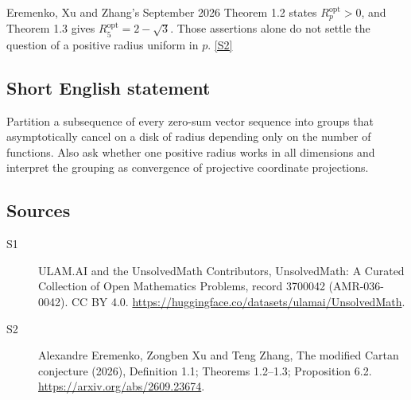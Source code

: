 \documentclass[11pt]{article}
\newcommand{\sref}[2]{\hyperlink{source:#1:#2}{[S#2]}}
\begin{document}
Eremenko, Xu and Zhang's September 2026 Theorem 1.2 states $R_p^{\mathrm{opt}}>0$, and Theorem 1.3 gives $R_5^{\mathrm{opt}}=2-\sqrt3$. Those assertions alone do not settle the question of a positive radius uniform in $p$. \sref{3700042}{2}
\subsection{Short English statement}
Partition a subsequence of every zero-sum vector sequence into groups that asymptotically cancel on a disk of radius depending only on the number of functions. Also ask whether one positive radius works in all dimensions and interpret the grouping as convergence of projective coordinate projections.
\subsection{Sources}
\begin{description}
\item[\hypertarget{source:3700042:1}{S1}] ULAM.AI and the UnsolvedMath Contributors, UnsolvedMath: A Curated Collection of Open Mathematics Problems, record 3700042 (AMR-036-0042). CC BY 4.0. \url{https://huggingface.co/datasets/ulamai/UnsolvedMath}.
\item[\hypertarget{source:3700042:2}{S2}] Alexandre Eremenko, Zongben Xu and Teng Zhang, The modified Cartan conjecture (2026), Definition 1.1; Theorems 1.2–1.3; Proposition 6.2. \url{https://arxiv.org/abs/2609.23674}.
\end{description}
\label{end:3700042}
\end{document}
